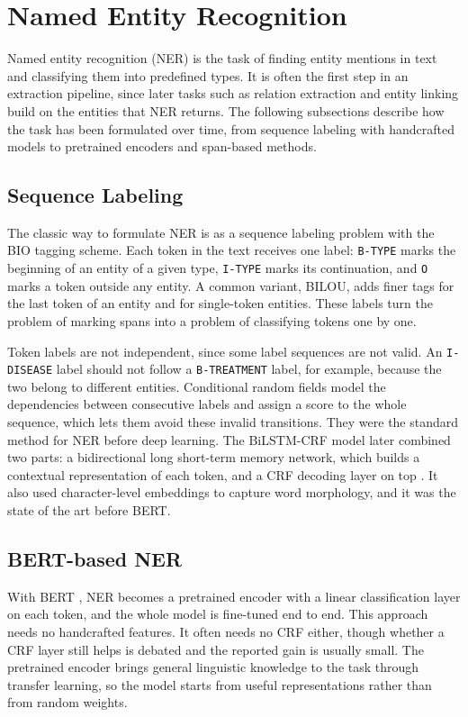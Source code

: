 \section{Named Entity Recognition}
\label{sec:ie-ner}

Named entity recognition (NER) is the task of finding entity mentions in text and classifying
them into predefined types. It is often the first step in an extraction pipeline, since later
tasks such as relation extraction and entity linking build on the entities that NER returns.
The following subsections describe how the task has been formulated over time, from sequence
labeling with handcrafted models to pretrained encoders and span-based methods.

\subsection{Sequence Labeling}

The classic way to formulate NER is as a sequence labeling problem with the BIO tagging
scheme. Each token in the text receives one label: \texttt{B-TYPE} marks the beginning of an
entity of a given type, \texttt{I-TYPE} marks its continuation, and \texttt{O} marks a token
outside any entity. A common variant, BILOU, adds finer tags for the last token of an entity
and for single-token entities. These labels turn the problem of marking spans into a problem
of classifying tokens one by one.

Token labels are not independent, since some label sequences are not valid. An
\texttt{I-DISEASE} label should not follow a \texttt{B-TREATMENT} label, for example, because
the two belong to different entities. Conditional random fields \citep{lafferty2001crf} model
the dependencies between consecutive labels and assign a score to the whole sequence, which
lets them avoid these invalid transitions. They were the standard method for NER before deep
learning. The BiLSTM-CRF model later combined two parts: a bidirectional long short-term
memory network, which builds a contextual representation of each token, and a CRF decoding
layer on top \citep{lample2016ner}. It also used character-level embeddings to capture word
morphology, and it was the state of the art before BERT.

\subsection{BERT-based NER}

With BERT \citep{devlin_bert_2019}, NER becomes a pretrained encoder with a linear
classification layer on each token, and the whole model is fine-tuned end to end. This
approach needs no handcrafted features. It often needs no CRF either, though whether a CRF
layer still helps is debated and the reported gain is usually small. The pretrained encoder
brings general linguistic knowledge to the task through transfer learning, so the model starts
from useful representations rather than from random weights.

